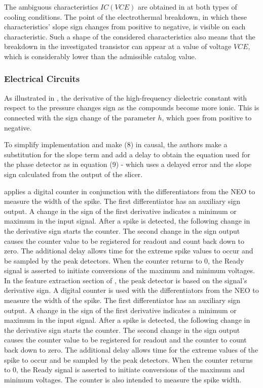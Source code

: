 \documentclass[11pt]{book}
\begin{document}
The ambiguous characteristics $IC\left(VCE\right)$ are obtained in
\cite{gorecki2021influence} at both types of cooling conditions.
The point of the electrothermal breakdown, in which these characteristics'
slope sign changes from positive to negative, is visible on each characteristic.
Such a shape of the considered characteristics also means that the
breakdown in the investigated transistor can appear at a value of
voltage $VCE$, which is considerably lower than the admissible catalog
value.


\subsubsection{Electrical Circuits}

As illustrated in \cite{davydov1998pressure}, the derivative of the
high-frequency dielectric constant with respect to the pressure changes
sign as the compounds become more ionic. This is connected with the
sign change of the parameter $h$, which goes from positive to negative.

To simplify implementation and make (8) in \cite{roo2000cmos} causal,
the authors make a substitution for the slope term and add a delay
to obtain the equation used for the phase detector as in equation
(9) - which uses a delayed error and the slope sign calculated from
the output of the slicer.

\cite{holleman2008micro} applies a digital counter in conjunction
with the differentiators from the NEO to measure the width of the
spike. The first differentiator has an auxiliary sign output. A change
in the sign of the first derivative indicates a minimum or maximum
in the input signal. After a spike is detected, the following change
in the derivative sign starts the counter. The second change in the
sign output causes the counter value to be registered for readout
and count back down to zero. The additional delay allows time for
the extreme spike values to occur and be sampled by the peak detectors.
When the counter returns to $0$, the Ready signal is asserted to
initiate conversions of the maximum and minimum voltages. In the feature
extraction section of \cite{holleman2011ultra}, the peak detector
is based on the signal's derivative sign. A digital counter is used
with the differentiators from the NEO to measure the width of the
spike. The first differentiator has an auxiliary sign output. A change
in the sign of the first derivative indicates a minimum or maximum
in the input signal. After a spike is detected, the following change
in the derivative sign starts the counter. The second change in the
sign output causes the counter value to be registered for readout
and the counter to count back down to zero. The additional delay allows
time for the extreme values of the spike to occur and be sampled by
the peak detectors. When the counter returns to $0$, the Ready signal
is asserted to initiate conversions of the maximum and minimum voltages.
The counter is also intended to measure the spike width.
\end{document}
